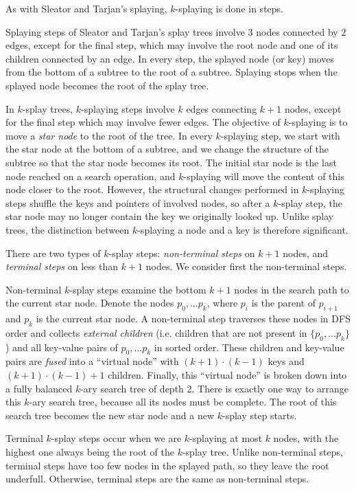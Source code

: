As with Sleator and Tarjan's splaying, $k$-splaying is done in steps.

Splaying steps of Sleator and Tarjan's splay trees involve 3 nodes connected
by 2 edges, except for the final step, which may involve the root node and one
of its children connected by an edge. In every step, the splayed node (or key)
moves from the bottom of a subtree to the root of a subtree.
Splaying stops when the splayed node becomes the root of the splay tree.

In $k$-splay trees, $k$-splaying steps involve $k$ edges connecting
$k+1$ nodes, except for the final step which may involve fewer edges.
The objective of $k$-splaying is to move a \emph{star node} to the
root of the tree. In every $k$-splaying step, we start with the star node
at the bottom of a subtree, and we change the structure of the subtree
so that the star node becomes its root.
The initial star node is the last node reached on a search operation, and
$k$-splaying will move the content of this node closer to the root.
However, the structural changes performed in $k$-splaying steps shuffle
the keys and pointers of involved nodes, so after a $k$-splay step,
the star node may no longer contain the key we originally looked up.
Unlike splay trees, the distinction between $k$-splaying a node and a key
is therefore significant.

There are two types of $k$-splay steps: \emph{non-terminal steps} on
$k+1$ nodes, and \emph{terminal steps} on less than $k+1$ nodes.
We consider first the non-terminal steps.

Non-terminal $k$-splay steps examine the bottom $k+1$ nodes in the search
path to the current star node. Denote the nodes $p_0,\ldots p_{k}$, where $p_i$
is the parent of $p_{i+1}$ and $p_k$ is the current star node. A non-terminal
step traverses these nodes in DFS order and collects \emph{external children}
(i.e. children that are not present in $\{p_0,\ldots p_k\}$) and all key-value
pairs of $p_0,\ldots p_k$ in sorted order. These children and key-value pairs
are \emph{fused} into a ``virtual node'' with $(k+1)\cdot (k-1)$ keys and
$(k+1)\cdot(k-1) + 1$ children. Finally, this ``virtual node'' is broken down
into a fully balanced $k$-ary search tree of depth 2. There is exactly one
way to arrange this $k$-ary search tree, because all its nodes must be complete.
The root of this search tree becomes the new star node and a new $k$-splay
step starts.

Terminal $k$-splay steps occur when we are $k$-splaying at most $k$
nodes, with the highest one always being the root of the $k$-splay tree.
Unlike non-terminal steps, terminal steps have too few nodes in the splayed
path, so they leave the root underfull. Otherwise, terminal steps are the same
as non-terminal steps.

